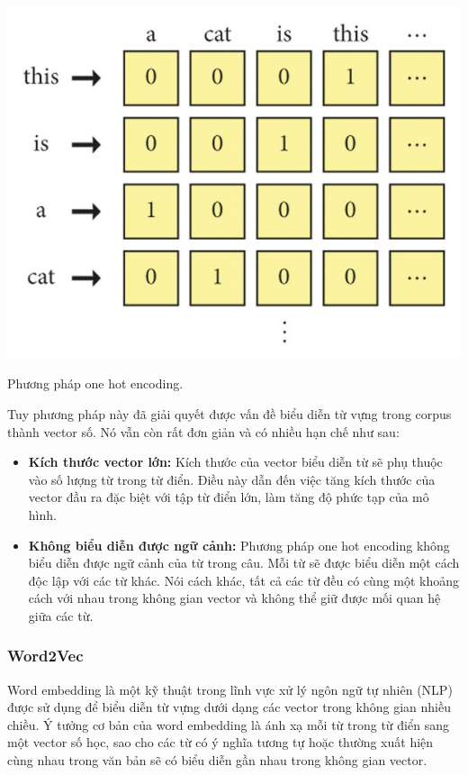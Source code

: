 \documentclass[a4paper, 12pt, openany]{book}
\begin{document}
\begin{minipage}{\linewidth}
    \captionsetup{type=figure}
    \centering
    \includegraphics[width=\linewidth]{./assets/images/onehot.png}
    \caption{Phương pháp one hot encoding.}
\end{minipage}
\vspace{0.5cm}

Tuy phương pháp này đã giải quyết được vấn đề biểu diễn từ vựng trong corpus thành 
vector số. Nó vẫn còn rất đơn giản và có nhiều hạn chế như sau:

\begin{itemize}
    \item \textbf{Kích thước vector lớn:} Kích thước của vector biểu diễn từ sẽ phụ thuộc vào số lượng từ trong từ điển. Điều này dẫn đến việc tăng kích thước của vector đầu ra đặc biệt với tập từ điển lớn, làm tăng độ phức tạp của mô hình.
    \item \textbf{Không biểu diễn được ngữ cảnh:} Phương pháp one hot encoding không biểu diễn được ngữ cảnh của từ trong câu. Mỗi từ sẽ được biểu diễn một cách độc lập với các từ khác.
    Nói cách khác, tất cả các từ đều có cùng một khoảng cách với nhau trong không gian vector và không thể giữ được mối quan hệ giữa các từ.
\end{itemize}

\subsubsection{Word2Vec}
Word embedding là một kỹ thuật trong lĩnh vực xử lý ngôn ngữ tự nhiên (NLP) được sử dụng để biểu diễn từ vựng dưới dạng các vector trong không gian nhiều chiều. Ý tưởng cơ bản của word embedding là ánh xạ mỗi từ trong từ điển sang một vector số học, sao cho các từ có ý nghĩa tương tự hoặc thường xuất hiện cùng nhau trong văn bản sẽ có biểu diễn gần nhau trong không gian vector.
\end{document}
